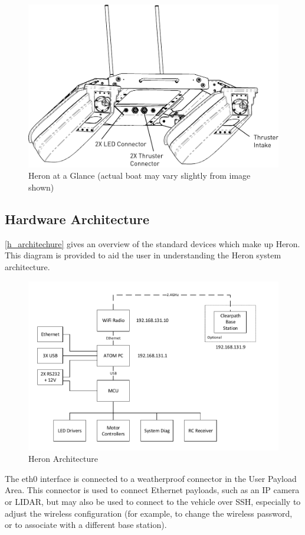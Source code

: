 \documentclass[]{clearpath-latex/clearpath-manual}
\begin{document}
\begin{figure}[h]
  \centering  \includegraphics[width=0.75\linewidth]{graphics/basics_3.pdf}
  \caption{Heron at a Glance (actual boat may vary slightly from image shown)}
  \label{h_the_basics3}
\end{figure}

\newpage

\subsection{Hardware Architecture}
\autoref{h_architechure} gives an overview of the standard devices which make up Heron. This diagram is provided to aid the user in understanding the Heron system architecture.

\begin{figure}[h]
  \centering
  \includegraphics[width=0.85\linewidth]{graphics/h-architecture.pdf}
  \caption{Heron Architecture}
  \label{h_architechure}
\end{figure}


The eth0 interface is connected to a weatherproof connector in the User Payload Area. This connector is used to connect Ethernet payloads, such as an IP camera or LIDAR, but may also be used to connect to the vehicle over SSH, especially to adjust the wireless configuration (for example, to change the wireless password, or to associate with a different base station).
\newpage
\end{document}
